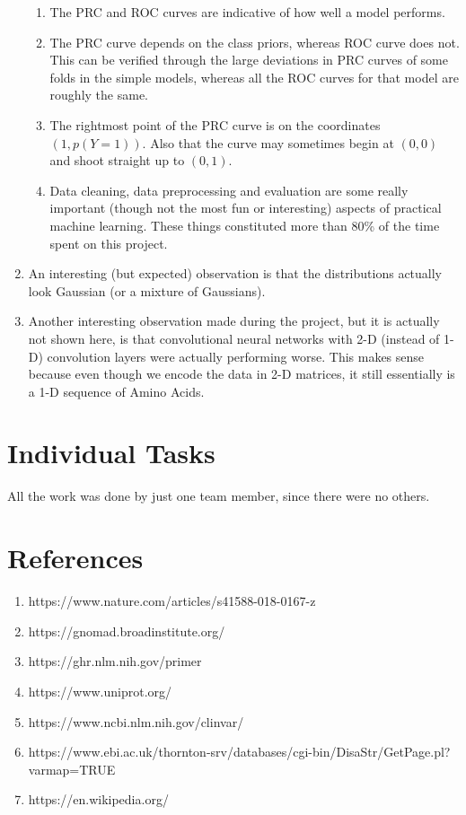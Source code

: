 \documentclass[twoside]{article}
\begin{document}
\begin{enumerate}
		\begin{enumerate}
			\item The PRC and ROC curves are indicative of how well a model performs.
			\item The PRC curve depends on the class priors, whereas ROC curve does not. This can be verified through the large deviations in PRC curves of some folds in the simple models, whereas all the ROC curves for that model are roughly the same.
			\item The rightmost point of the PRC curve is on the coordinates $(1, p(Y=1))$. Also that the curve may sometimes begin at $(0,0)$ and shoot straight up to $(0,1)$.
			\item Data cleaning, data preprocessing and evaluation are some really important (though not the most fun or interesting) aspects of practical machine learning. These things constituted more than 80\% of the time spent on this project.
		\end{enumerate}
	\item An interesting (but expected) observation is that the distributions actually look Gaussian (or a mixture of Gaussians).
	\item Another interesting observation made during the project, but it is actually not shown here, is that convolutional neural networks with 2-D (instead of 1-D) convolution layers were actually performing worse. This makes sense because even though we encode the data in 2-D matrices, it still essentially is a 1-D sequence of Amino Acids.
	\end{enumerate}
	
	
	\newpage
	
	\section{Individual Tasks}
	All the work was done by just one team member, since there were no others.
	
	
	
	\section{References}
	\begin{enumerate}
		\item https://www.nature.com/articles/s41588-018-0167-z
		\item https://gnomad.broadinstitute.org/
		\item https://ghr.nlm.nih.gov/primer
		\item https://www.uniprot.org/
		\item https://www.ncbi.nlm.nih.gov/clinvar/
		\item https://www.ebi.ac.uk/thornton-srv/databases/cgi-bin/DisaStr/GetPage.pl?varmap=TRUE
		\item https://en.wikipedia.org/
	\end{enumerate}
	
	
\end{document}
